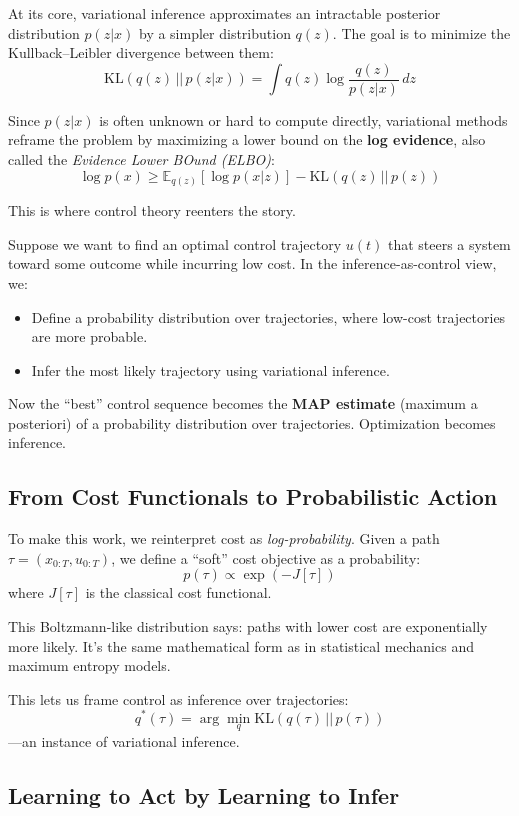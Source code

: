 At its core, variational inference approximates an intractable posterior distribution \( p(z|x) \) by a simpler distribution \( q(z) \). The goal is to minimize the Kullback–Leibler divergence between them:
\[
\text{KL}(q(z) \,||\, p(z|x)) = \int q(z) \log \frac{q(z)}{p(z|x)} \, dz
\]

Since \( p(z|x) \) is often unknown or hard to compute directly, variational methods reframe the problem by maximizing a lower bound on the \textbf{log evidence}, also called the \emph{Evidence Lower BOund (ELBO)}:
\[
\log p(x) \geq \mathbb{E}_{q(z)}[\log p(x|z)] - \text{KL}(q(z) \,||\, p(z))
\]

This is where control theory reenters the story.

Suppose we want to find an optimal control trajectory \( u(t) \) that steers a system toward some outcome while incurring low cost. In the inference-as-control view, we:

\begin{itemize}
  \item Define a probability distribution over trajectories, where low-cost trajectories are more probable.
  \item Infer the most likely trajectory using variational inference.
\end{itemize}

Now the “best” control sequence becomes the \textbf{MAP estimate} (maximum a posteriori) of a probability distribution over trajectories. Optimization becomes inference.

\subsection{From Cost Functionals to Probabilistic Action}

To make this work, we reinterpret cost as \emph{log-probability}. Given a path \( \tau = (x_{0:T}, u_{0:T}) \), we define a “soft” cost objective as a probability:
\[
p(\tau) \propto \exp\left( - J[\tau] \right)
\]
where \( J[\tau] \) is the classical cost functional.

This Boltzmann-like distribution says: paths with lower cost are exponentially more likely. It’s the same mathematical form as in statistical mechanics and maximum entropy models.

This lets us frame control as inference over trajectories:
\[
q^*(\tau) = \arg\min_q \text{KL}(q(\tau) \,||\, p(\tau))
\]
—an instance of variational inference.

\subsection{Learning to Act by Learning to Infer}

